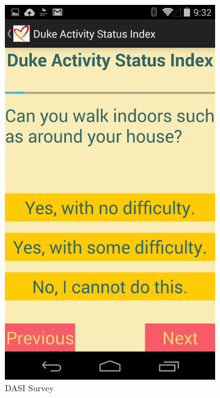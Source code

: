 \begin{figure}[ht]
\centering
  
  \begin{subfigure}[b]{0.3\textwidth}
  \includegraphics[scale=1,width=\textwidth]{Images/DASI.png}
  \caption{DASI Survey}
  \label{fig:DASI}
  \end{subfigure}
  ~
  \begin{subfigure}[b]{0.3\textwidth}

\end{subfigure}
\end{figure}

